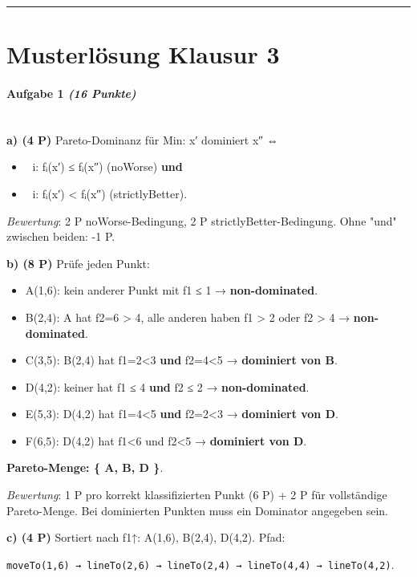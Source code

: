 \documentclass[11pt, a4paper]{article}
\begin{document}
\noindent\textcolor{rulegray}{\rule{\linewidth}{0.4pt}}



\section{Musterlösung Klausur 3}

\paragraph{Aufgabe 1 \textit{(16 Punkte)}}\mbox{}\\[2pt]

\textbf{a) (4 P)} Pareto-Dominanz für Min: x⃗′ dominiert x⃗″ ⇔

\begin{itemize}
  \item ∀ i: fᵢ(x⃗′) ≤ fᵢ(x⃗″) (noWorse) \textbf{und}
  \item ∃ i: fᵢ(x⃗′) < fᵢ(x⃗″) (strictlyBetter).
\end{itemize}

\textit{Bewertung}: 2 P noWorse-Bedingung, 2 P strictlyBetter-Bedingung. Ohne "und" zwischen beiden: -1 P.


\textbf{b) (8 P)} Prüfe jeden Punkt:


\begin{itemize}
  \item A(1,6): kein anderer Punkt mit f1 ≤ 1 → \textbf{non-dominated}.
  \item B(2,4): A hat f2=6 > 4, alle anderen haben f1 > 2 oder f2 > 4 → \textbf{non-dominated}.
  \item C(3,5): B(2,4) hat f1=2<3 \textbf{und} f2=4<5 → \textbf{dominiert von B}.
  \item D(4,2): keiner hat f1 ≤ 4 \textbf{und} f2 ≤ 2 → \textbf{non-dominated}.
  \item E(5,3): D(4,2) hat f1=4<5 \textbf{und} f2=2<3 → \textbf{dominiert von D}.
  \item F(6,5): D(4,2) hat f1<6 und f2<5 → \textbf{dominiert von D}.
\end{itemize}

\textbf{Pareto-Menge: \{ A, B, D \}}.


\textit{Bewertung}: 1 P pro korrekt klassifizierten Punkt (6 P) + 2 P für vollständige Pareto-Menge. Bei dominierten Punkten muss ein Dominator angegeben sein.


\textbf{c) (4 P)} Sortiert nach f1↑: A(1,6), B(2,4), D(4,2). Pfad:

\texttt{moveTo(1,6) → lineTo(2,6) → lineTo(2,4) → lineTo(4,4) → lineTo(4,2)}.
\end{document}
